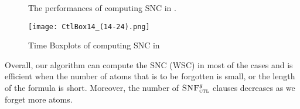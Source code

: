 \documentclass[twoside,11pt]{article}
\begin{document}
	\begin{figure*}[!htb]
		\centering
		\caption{The performances of computing SNC in \CTL.}
		\label{fig:CtlTime}
	\end{figure*}
	
	
	\begin{figure*}[ht]
		\centering
		\texttt{[image: CtlBox14\_(14-24).png]}\\
		\caption{Time Boxplots of computing SNC in \CTL}\label{CtlBox14_(14-24)}
	\end{figure*}
	
	Overall, our algorithm can compute the SNC (WSC) in most of the  cases and is efficient when the number of atoms that is to be forgotten is small, or the length of the formula is short.
	Moreover, the number of  ${\textsc{SNF}_{\textsc{ctl}}^g}$ clauses decreases as we forget more atoms.
	
\end{document}
